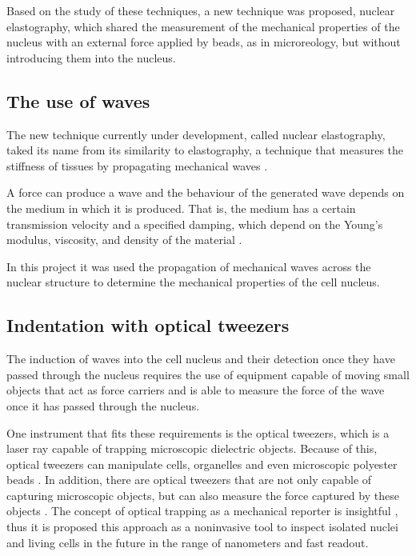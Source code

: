 \documentclass[12pt, a4paper]{article} %
\begin{document}
Based on the study of these techniques, a new technique was proposed, nuclear elastography, which shared the measurement of the mechanical properties of the nucleus with an external force applied by beads, as in microreology, but without introducing them into the nucleus. 
 
 \setlength{\parskip}{0mm}

\subsection{The use of waves}

The new technique currently under development, called nuclear elastography, taked its name from its similarity to elastography, a technique that measures the stiffness of tissues by propagating mechanical waves \cite{gennisson2013ultrasound}. 

\setlength{\parskip}{4mm}

A force can produce a wave and the behaviour of the generated wave depends on the medium in which it is produced. That is, the medium has a certain transmission velocity and a specified damping, which depend on the Young's modulus, viscosity, and density of the material \cite{achenbach2012wave}. 

In this project it was used the propagation of mechanical waves across the nuclear structure to determine the mechanical properties of the cell nucleus.

\setlength{\parskip}{0mm}

\subsection{Indentation with optical tweezers}

The induction of waves into the cell nucleus and their detection once they have passed through the nucleus requires the use of equipment capable of moving small objects that act as force carriers and is able to measure the force of the wave once it has passed through the nucleus. 

\setlength{\parskip}{4mm}

One instrument that fits these requirements is the optical tweezers, which is a laser ray capable of trapping microscopic dielectric objects. Because of this, optical tweezers can manipulate cells, organelles and even microscopic polyester beads \cite{novotny1997theory, ombid2020vitro, ashkin1992forces}. In addition, there are optical tweezers that are not only capable of capturing microscopic objects, but can also measure the force captured by these objects \cite{farre2014force}. The concept of optical trapping as a mechanical reporter is insightful \cite{ashkin20182018}, thus it is proposed this approach as a noninvasive tool to inspect isolated nuclei and living cells in the future in the range of nanometers and fast readout.
\end{document}
